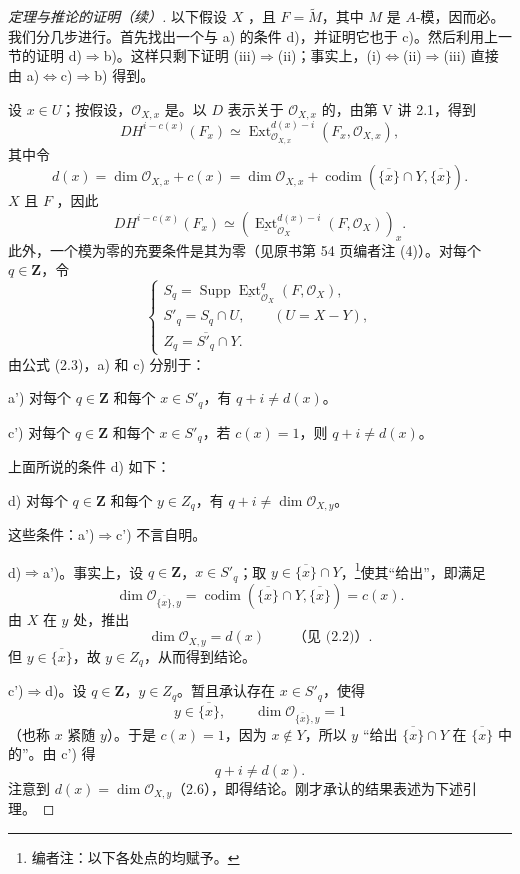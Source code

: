 \begin{proof}[定理与推论的证明（续）]
以下假设 $X$ ，且 $F=\widetilde M$，其中 $M$ 是 $A$-模，因而必。我们分几步进行。首先找出一个与 a) 的条件 d)，并证明它也于 c)。然后利用上一节的证明 d)$\Rightarrow$b)。这样只剩下证明 (iii)$\Rightarrow$(ii)；事实上，(i)$\Leftrightarrow$(ii)$\Rightarrow$(iii) 直接由 a)$\Leftrightarrow$c)$\Rightarrow$b) 得到。

设 $x\in U$；按假设，$\mathscr O_{X,x}$ 是。以 $D$ 表示关于 $\mathscr O_{X,x}$ 的，由第 V 讲 2.1，得到
\[DH^{i-c(x)}(F_x)\simeq\operatorname{Ext}^{d(x)-i}_{\mathscr O_{X,x}}(F_x,\mathscr O_{X,x}),\]
其中令
\[d(x)=\dim\mathscr O_{X,x}+c(x)=\dim\mathscr O_{X,x}+\operatorname{codim}(\overline{\{x\}}\cap Y,\overline{\{x\}}).\tag{2.2}\]
$X$ 且 $F$ ，因此
\[DH^{i-c(x)}(F_x)\simeq(\underline{\operatorname{Ext}}^{d(x)-i}_{\mathscr O_X}(F,\mathscr O_X))_x.\tag{2.3}\]
此外，一个模为零的充要条件是其为零（见原书第 54 页编者注 (4)）。对每个 $q\in\mathbf Z$，令
\[
\begin{cases}
S_q=\operatorname{Supp}\underline{\operatorname{Ext}}^q_{\mathscr O_X}(F,\mathscr O_X),\\
S'_q=S_q\cap U,\qquad(U=X-Y),\\
Z_q=\overline{S'_q}\cap Y.
\end{cases}\tag{2.4}
\]
由公式 (2.3)，a) 和 c) 分别于：

 a') 对每个 $q\in\mathbf Z$ 和每个 $x\in S'_q$，有 $q+i\neq d(x)$。

 c') 对每个 $q\in\mathbf Z$ 和每个 $x\in S'_q$，若 $c(x)=1$，则 $q+i\neq d(x)$。

上面所说的条件 d) 如下：

 d) 对每个 $q\in\mathbf Z$ 和每个 $y\in Z_q$，有 $q+i\neq\dim\mathscr O_{X,y}$。

这些条件：a')$\Rightarrow$c') 不言自明。

 d)$\Rightarrow$a')。事实上，设 $q\in\mathbf Z$，$x\in S'_q$；取 $y\in\overline{\{x\}}\cap Y$，\footnote{编者注：以下各处点的均赋予。}使其“给出”，即满足
\[\dim\mathscr O_{\overline{\{x\}},y}=\operatorname{codim}(\overline{\{x\}}\cap Y,\overline{\{x\}})=c(x).\tag{2.5}\]
由 $X$ 在 $y$ 处，推出
\[\dim\mathscr O_{X,y}=d(x)\qquad\text{（见 (2.2)）}.\tag{2.6}\]
但 $y\in\overline{\{x\}}$，故 $y\in Z_q$，从而得到结论。

 c')$\Rightarrow$d)。设 $q\in\mathbf Z$，$y\in Z_q$。暂且承认存在 $x\in S'_q$，使得
\[y\in\overline{\{x\}},\qquad\dim\mathscr O_{\overline{\{x\}},y}=1\]
（也称 $x$ 紧随 $y$）。于是 $c(x)=1$，因为 $x\notin Y$，所以 $y$ “给出 $\overline{\{x\}}\cap Y$ 在 $\overline{\{x\}}$ 中的”。由 c') 得
\[q+i\neq d(x).\]
注意到 $d(x)=\dim\mathscr O_{X,y}$（2.6），即得结论。刚才承认的结果表述为下述引理。
\end{proof}
